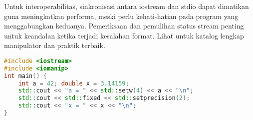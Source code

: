 \documentclass[../main.tex]{subfiles}
\begin{document}
Untuk interoperabilitas, sinkronisasi antara iostream dan stdio dapat dimatikan guna meningkatkan performa, meski perlu kehati-hatian pada program yang menggabungkan keduanya. Pemeriksaan dan pemulihan status stream penting untuk keandalan ketika terjadi kesalahan format. Lihat \textcite{cplusplus-io,cpp-reference} untuk katalog lengkap manipulator dan praktik terbaik.

\begin{lstlisting}[language=C++, caption={Contoh output C++ dengan iostream dan iomanip}, label={lst:cpp-output}]
#include <iostream>
#include <iomanip>
int main() {
    int a = 42; double x = 3.14159;
    std::cout << "a = " << std::setw(4) << a << "\n";
    std::cout << std::fixed << std::setprecision(2);
    std::cout << "x = " << x << "\n";
}
\end{lstlisting}
\end{document}
